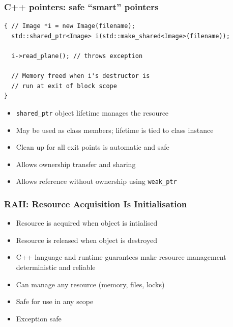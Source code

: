 \documentclass{beamer}
\begin{document}
\begin{frame}[fragile]
  \frametitle{C++ pointers: safe “smart” pointers}
  \begin{lstlisting}
{ // Image *i = new Image(filename);
  std::shared_ptr<Image> i(std::make_shared<Image>(filename));

  i->read_plane(); // throws exception

  // Memory freed when i's destructor is
  // run at exit of block scope
}

\end{lstlisting}
  \begin{itemize}
    \item \texttt{shared\_ptr} object lifetime manages the resource
    \item May be used as class members; lifetime is tied to class instance
    \item Clean up for all exit points is automatic and safe
    \item Allows ownership transfer and sharing
    \item Allows reference without ownership using \texttt{weak\_ptr}
  \end{itemize}
\end{frame}

\begin{frame}[fragile]
  \frametitle{RAII: Resource Acquisition Is Initialisation}
    \begin{itemize}
    \item Resource is acquired when object is intialised
    \item Resource is released when object is destroyed
    \item C++ language and runtime guarantees make resource management
      deterministic and reliable
    \item Can manage any resource (memory, files, locks)
    \item Safe for use in any scope
    \item Exception safe
    \end{itemize}
\end{frame}
\end{document}
